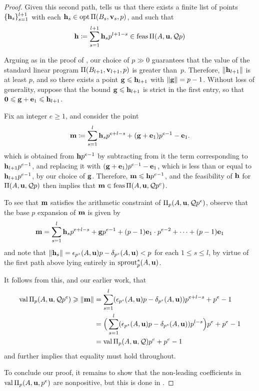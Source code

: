 \documentclass[11pt]{amsart}
\begin{document}
\begin{proof}
Given this second path,  tells us that there exists a finite list of points $\{ \mathbf{h}_s \}_{s=1}^{l+1}$ with each $\mathbf{h}_s \in \operatorname{opt} \Pi(B_s, \mathbf{v}_s, p)$, and such that  
%
\[ \mathbf{h} \coloneqq \sum_{s=1}^{l+1} \mathbf{h}_s p^{l+1-s} \in \operatorname{feas} \Pi(A,\mathbf{u}, \mathcal{Q} p) \] 
%

 
Arguing as in the proof of , our choice of $p \gg 0$ guarantees that the value of the standard linear program $\Pi(B_{l+1}, \mathbf{v}_{l+1},p)$ is greater than~$p$.  Therefore,  $\| \mathbf{h}_{l+1} \|$ is at least $p$, and so there exists a point $\mathbf{g} \leqslant \mathbf{h}_{l+1}$ with $\| \mathbf{g} \| = p-1$.  Without loss of generality, suppose that the bound $\mathbf{g} \leqslant \mathbf{h}_{l+1}$ is strict in the first entry, so that $\mathbf{0} \leqslant \mathbf{g} + \mathbf{e}_1 \leqslant \mathbf{h}_{l+1}$.


Fix an integer $e \geq 1$, and consider the point 
\[ \mathbf{m} \coloneqq \sum_{s=1}^{l} \mathbf{h}_s p^{e+l-s} + (\mathbf{g}+\mathbf{e}_1)p^{e-1} - \mathbf{e}_1. \] 
which is obtained from $\mathbf{h}p^{e-1}$ by subtracting from it the term corresponding to $\mathbf{h}_{l+1}p^{e-1}$, and replacing it with  $(\mathbf{g}+\mathbf{e}_1)p^{e-1} - \mathbf{e}_1$, which is less than or equal to $\mathbf{h}_{l+1} p^{e-1}$, by our choice of $\mathbf{g}$.  Therefore, $\mathbf{m} \leqslant \mathbf{h}p^{e-1}$, and the feasibility of $\mathbf{h}$ for $\Pi(A,\mathbf{u}, \mathcal{Q} p)$ then implies that $\mathbf{m} \in \operatorname{feas} \Pi(A,\mathbf{u}, \mathcal{Q} p^e)$.  

To see that $\mathbf{m}$ satisfies the arithmetic constraint of $\Pi_p(A,\mathbf{u}, \mathcal{Q} p^e)$, observe that the base $p$ expansion of $\mathbf{m}$ is given by 
\[ \mathbf{m} = \sum_{s=1}^{l} \mathbf{h}_s p^{e+l-s} + \mathbf{g}p^{e-1} + (p-1) \mathbf{e}_1 \cdot p^{e-2} + \cdots + (p-1)\mathbf{e}_1\] 
and note that $\| \mathbf{h}_s \| = \epsilon_{p^s}(A,\mathbf{u})p-\delta_{p^s}(A,\mathbf{u}) < p$ for each $1 \leq s \leq l$, by virtue of the first path above lying entirely in $\operatorname{sprout}_p^{\ast}(A,\mathbf{u})$.  

It follows from this, and our earlier work, that 
%
\begin{align*} 
\operatorname{val} \Pi_p(A,\mathbf{u}, \mathcal{Q} p^e) \geqslant \| \mathbf{m} \| & = \sum_{s=1}^l (\epsilon_{p^s}(A,\mathbf{u})p-\delta_{p^s}(A,\mathbf{u})) p^{e+l-s} + p^e-1 \\ 
& = \Big ( \sum_{s=1}^l (\epsilon_{p^s}(A,\mathbf{u})p-\delta_{p^s}(A,\mathbf{u})) p^{l-s} \Big ) p^e + p^e-1 \\ 
 & = \operatorname{val} \Pi_p(A,\mathbf{u}, \mathcal{Q}) p^e + p^e-1
\end{align*}
and  further implies that equality must hold throughout.

To conclude our proof, it remains to show that the non-leading coefficients in $\operatorname{val} \Pi_p(A,\mathbf{u},p^e)$ are nonpositive, but this is done in  .
\end{proof}
\end{document}
